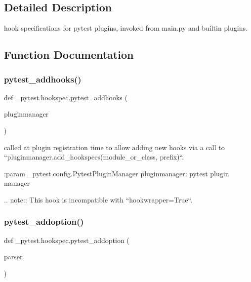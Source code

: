 \subsection{Detailed Description}
\begin{DoxyVerb}hook specifications for pytest plugins, invoked from main.py and builtin plugins.  \end{DoxyVerb}
 

\subsection{Function Documentation}
\mbox{\label{namespace__pytest_1_1hookspec_a20a7b814b1188ff72e79bd6c0dab3073}} 
\subsubsection{\texorpdfstring{pytest\+\_\+addhooks()}{pytest\_addhooks()}}
{\footnotesize\ttfamily def \+\_\+pytest.\+hookspec.\+pytest\+\_\+addhooks (\begin{DoxyParamCaption}\item[{}]{pluginmanager }\end{DoxyParamCaption})}

\begin{DoxyVerb}called at plugin registration time to allow adding new hooks via a call to
``pluginmanager.add_hookspecs(module_or_class, prefix)``.


:param _pytest.config.PytestPluginManager pluginmanager: pytest plugin manager

.. note::
    This hook is incompatible with ``hookwrapper=True``.
\end{DoxyVerb}
 \mbox{\label{namespace__pytest_1_1hookspec_a2fb07435eda4386f8fb4b1a081ecb121}} 
\subsubsection{\texorpdfstring{pytest\+\_\+addoption()}{pytest\_addoption()}}
{\footnotesize\ttfamily def \+\_\+pytest.\+hookspec.\+pytest\+\_\+addoption (\begin{DoxyParamCaption}\item[{}]{parser }\end{DoxyParamCaption})}

